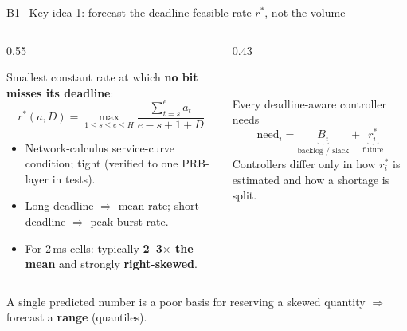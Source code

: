 \documentclass[aspectratio=169,10pt,xcolor={table,dvipsnames}]{beamer}
\newcommand{\rstar}{r^{\ast}}
\begin{document}
\begin{frame}{B1 \textbullet\ Key idea 1: forecast the deadline-feasible rate $\rstar$, not the volume}
\begin{columns}[c]
\begin{column}{0.55\textwidth}
\begin{tcolorbox}[enhanced,colback=soft,colframe=iitblue,boxrule=0.8pt,arc=3pt,halign=center]
Smallest constant rate at which \textbf{no bit misses its deadline}:
\[ \rstar(a, D) = \max_{1\le s\le e\le H} \frac{\sum_{t=s}^{e} a_t}{e - s + 1 + D} \]
\end{tcolorbox}
\small
\begin{itemize}
  \item Network-calculus service-curve condition; tight (verified to one PRB-layer in tests).
  \item Long deadline $\Rightarrow$ mean rate; short deadline $\Rightarrow$ peak burst rate.
  \item For 2\,ms cells: typically \textbf{2--3$\times$ the mean} and strongly \textbf{right-skewed}.
\end{itemize}
\end{column}
\begin{column}{0.43\textwidth}
\centering
{}\\[2pt]
\begin{block}{Every deadline-aware controller needs}
\[ \text{need}_i = \underbrace{B_i}_{\text{backlog / slack}} + \underbrace{\rstar_i}_{\text{future}} \]
\footnotesize Controllers differ only in how $\rstar_i$ is estimated and how a shortage is split.
\end{block}
\end{column}
\end{columns}
\vspace{0.2em}
\begin{takeaway}
A single predicted number is a poor basis for reserving a skewed quantity $\Rightarrow$ forecast a \textbf{range} (quantiles).
\end{takeaway}
\end{frame}
\end{document}
